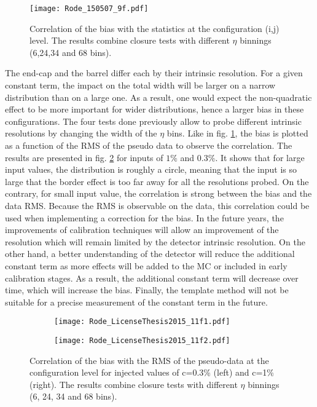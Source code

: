 \begin{enumerate}
\begin{figure}[htbp]
\centering
\texttt{[image: Rode\_150507\_9f.pdf]}
\caption{\label{fig:org684acbd}
Correlation of the bias with the statistics at the configuration (i,j) level. The results combine closure tests with different $\eta$ binnings (6,24,34 and 68 bins).\cite{Rode2015}}
\end{figure}

The end-cap and the barrel differ each by their intrinsic resolution.
For a given constant term, the impact on the total width will be larger on a narrow distribution than on a large one.
As a result, one would expect the non-quadratic effect to be more important for wider distributions, hence a larger bias in these configurations.
The four tests done previously allow to probe different intrinsic resolutions by changing the width of the $\eta$ bins.
Like in fig. \ref{fig:org684acbd}, the bias is plotted as a function of the RMS of the pseudo data to observe the correlation.
The results are presented in fig. \ref{orgddfecd1} for inputs of $1\%$ and $0.3\%$.
It shows that for large input values, the distribution is roughly a circle, meaning that the input is so large that the border effect is too far away for all the resolutions probed.
On the contrary, for small input value, the correlation is strong between the bias and the data RMS.
Because the RMS is observable on the data, this correlation could be used when implementing a correction for the bias.
In the future years, the improvements of calibration techniques will allow an improvement of the resolution which will remain limited by the detector intrinsic resolution.
On the other hand, a better understanding of the detector will reduce the additional constant term as more effects will be added to the MC or included in early calibration stages.
As a result, the additional constant term will decrease over time, which will increase the bias.
Finally, the template method will not be suitable for a precise measurement of the constant term in the future.

\begin{figure}
\begin{subfigure}[t]{0.49\linewidth}
\begin{center}
\texttt{[image: Rode\_LicenseThesis2015\_11f1.pdf]}
\end{center}
\end{subfigure}
\begin{subfigure}[t]{0.49\linewidth}
\begin{center}
\texttt{[image: Rode\_LicenseThesis2015\_11f2.pdf]}
\end{center}
\end{subfigure}
\caption{\label{orgddfecd1}
Correlation of the bias with the RMS of the pseudo-data at the configuration level for injected values of c=0.3\% (left) and c=1\% (right). The results combine closure tests with different $\eta$ binnings (6, 24, 34 and 68 bins).\cite{Rode2015}}
\end{figure}






\end{enumerate}
